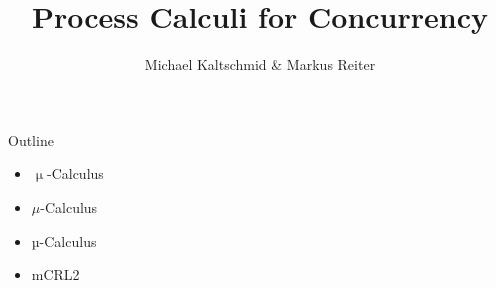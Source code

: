 \documentclass{beamer}
\title{Process Calculi for Concurrency}
\author{Michael Kaltschmid \& Markus Reiter}
\date{}
\begin{document}
  \maketitle

  \begin{frame}{Outline}
    \begin{itemize}
      \item $\upmu$-Calculus
      \item $\mu$-Calculus
      \item µ-Calculus
      \item mCRL2
    \end{itemize}
  \end{frame}
\end{document}
